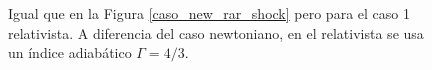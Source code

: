 \documentclass[12pt,a4paper]{book}
\begin{document}
\begin{figure}
    \caption{Igual que en la Figura \ref{caso_new_rar_shock} pero para el caso 1 relativista. A diferencia 
    del caso newtoniano, en el relativista se usa un índice 
    adiabático $\Gamma = 4/3$. \label{caso_rel_rar_shock_1}}
\end{figure}
\end{document}
